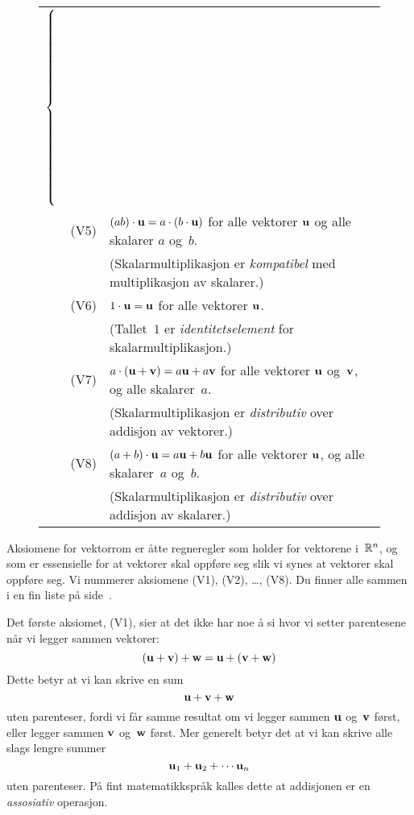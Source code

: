 \begin{figure*}[p]
\begin{center}
\begin{minipage}{.9\textwidth}
\begin{center}
\begin{tabular}{rll}
{$\left\{\rule{0pt}{90pt}\right.$
}
\\[-4pt]
& {\large {\LARGE(}V5{\LARGE)}} &
$(ab) \cdot \mathbf{u} = a \cdot (b \cdot \mathbf{u})$
for alle vektorer $\mathbf{u}$ og alle skalarer $a$ og~$b$.
\\[4pt]
&&{\small (Skalarmultiplikasjon er \emph{kompatibel} med multiplikasjon av skalarer.)}
\\[10pt]
& {\large {\LARGE(}V6{\LARGE)}} &
$1 \cdot \mathbf{u} = \mathbf{u}$
for alle vektorer $\mathbf{u}$.
\\[4pt]
&&{\small (Tallet~$1$ er \emph{identitetselement} for skalarmultiplikasjon.)}
\\[10pt]
& {\large {\LARGE(}V7{\LARGE)}} &
$a \cdot (\mathbf{u} + \mathbf{v}) = a \mathbf{u} + a \mathbf{v}$
for alle vektorer $\mathbf{u}$ og~$\mathbf{v}$, og alle skalarer~$a$.
\\[4pt]
&&{\small (Skalarmultiplikasjon er \emph{distributiv} over addisjon av vektorer.)}
\\[10pt]
& {\large {\LARGE(}V8{\LARGE)}} &
$(a + b) \cdot \mathbf{u} = a \mathbf{u} + b \mathbf{u}$
for alle vektorer $\mathbf{u}$, og alle skalarer~$a$ og~$b$.
\\[4pt]
&&{\small (Skalarmultiplikasjon er \emph{distributiv} over addisjon av skalarer.)}
\end{tabular}
\hspace{10pt}\hbox{}

\vspace{30pt}
\hfill
{}
\end{center}
\end{minipage}
\end{center}
\label{fig:aksiomene}
\end{figure*}

Aksiomene for vektorrom er åtte regneregler som holder for vektorene
i~$\mathbb{R}^n$, og som er essensielle for at vektorer skal oppføre seg slik
vi synes at vektorer skal oppføre seg.  Vi nummerer aksiomene (V1),
(V2), \ldots, (V8).  Du finner alle sammen i en fin liste på
side~\pageref{fig:aksiomene}.

Det første aksiomet, (V1), sier at det ikke har noe å si hvor vi
setter parentesene når vi legger sammen vektorer:
\[
(\mathbf{u} + \mathbf{v}) + \mathbf{w} = \mathbf{u} + (\mathbf{v} + \mathbf{w})
\]
Dette betyr at vi kan skrive en sum
\[
\mathbf{u} + \mathbf{v} + \mathbf{w}
\]
uten parenteser, fordi vi får samme resultat om vi legger sammen
$\mathbf{u}$ og~$\mathbf{v}$ først, eller legger sammen $\mathbf{v}$ og~$\mathbf{w}$
først.  Mer generelt betyr det at vi kan skrive alle slags lengre
summer
\[
\mathbf{u}_1 + \mathbf{u}_2 + \cdots \mathbf{u}_n
\]
uten parenteser.  På fint matematikkspråk kalles dette at addisjonen
er en \emph{assosiativ} operasjon.

